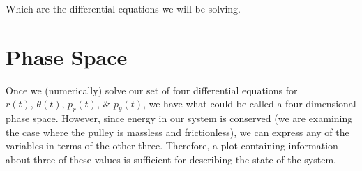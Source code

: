 \documentclass{article}
\begin{document}
Which are the differential equations we will be solving.

\section*{Phase Space}

Once we (numerically) solve our set of four differential equations for $r(t),\, \theta(t),\, p_{r}(t),\,\& \,\, p_{\theta}(t)$, we have what could be called a four-dimensional phase space.  However, since energy in our system is conserved (we are examining the case where the pulley is massless and frictionless), we can express any of the variables in terms of the other three.  Therefore, a plot containing information about three of these values is sufficient for describing the state of the system.
\end{document}
